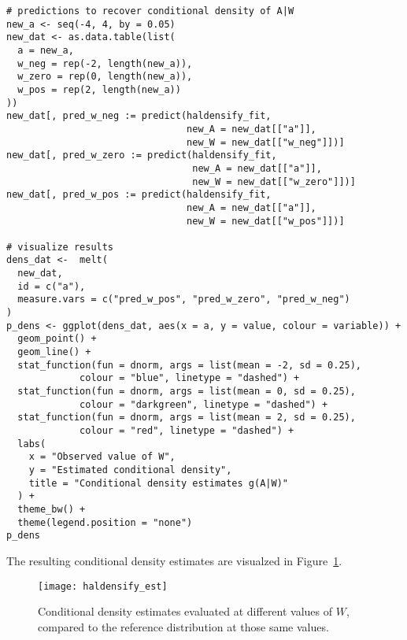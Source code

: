 \begin{lstlisting}
# predictions to recover conditional density of A|W
new_a <- seq(-4, 4, by = 0.05)
new_dat <- as.data.table(list(
  a = new_a,
  w_neg = rep(-2, length(new_a)),
  w_zero = rep(0, length(new_a)),
  w_pos = rep(2, length(new_a))
))
new_dat[, pred_w_neg := predict(haldensify_fit,
                                new_A = new_dat[["a"]],
                                new_W = new_dat[["w_neg"]])]
new_dat[, pred_w_zero := predict(haldensify_fit,
                                 new_A = new_dat[["a"]],
                                 new_W = new_dat[["w_zero"]])]
new_dat[, pred_w_pos := predict(haldensify_fit,
                                new_A = new_dat[["a"]],
                                new_W = new_dat[["w_pos"]])]

# visualize results
dens_dat <-  melt(
  new_dat,
  id = c("a"),
  measure.vars = c("pred_w_pos", "pred_w_zero", "pred_w_neg")
)
p_dens <- ggplot(dens_dat, aes(x = a, y = value, colour = variable)) +
  geom_point() +
  geom_line() +
  stat_function(fun = dnorm, args = list(mean = -2, sd = 0.25),
             colour = "blue", linetype = "dashed") +
  stat_function(fun = dnorm, args = list(mean = 0, sd = 0.25),
             colour = "darkgreen", linetype = "dashed") +
  stat_function(fun = dnorm, args = list(mean = 2, sd = 0.25),
             colour = "red", linetype = "dashed") +
  labs(
    x = "Observed value of W",
    y = "Estimated conditional density",
    title = "Conditional density estimates g(A|W)"
  ) +
  theme_bw() +
  theme(legend.position = "none")
p_dens
\end{lstlisting}

The resulting conditional density estimates are visualzed in
Figure~\ref{fig:haldensify_est}.
\begin{figure}[H]
  \centering
  \texttt{[image: haldensify\_est]}
  \caption{Conditional density estimates evaluated at different values of $W$,
    compared to the reference distribution at those same values.}
  \label{fig:haldensify_est}
\end{figure}
